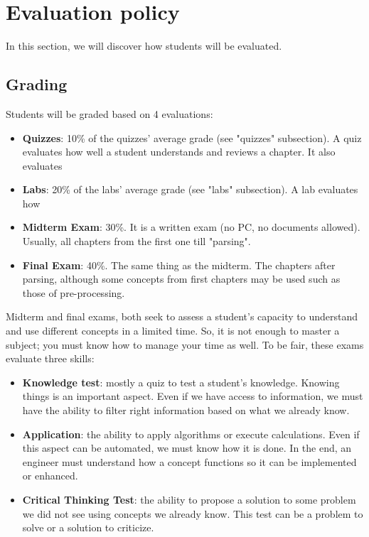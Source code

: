 \documentclass[11pt, a4paper]{article}
\begin{document}
\section{Evaluation policy}

In this section, we will discover how students will be evaluated.

\subsection{Grading}

Students will be graded based on 4 evaluations:
\begin{itemize}
	\item \textbf{Quizzes}: 10\% of the quizzes' average grade (see "quizzes" subsection). 
	A quiz evaluates how well a student understands and reviews a chapter. 
	It also evaluates 
	\item \textbf{Labs}: 20\% of the labs' average grade (see "labs" subsection).
	A lab evaluates how 
	\item \textbf{Midterm Exam}: 30\%. It is a written exam (no PC, no documents allowed). 
	Usually, all chapters from the first one till "parsing".
	\item \textbf{Final Exam}: 40\%. The same thing as the midterm. The chapters after parsing, although some concepts from first chapters may be used such as those of pre-processing.
\end{itemize}

Midterm and final exams, both seek to assess a student's capacity to understand and use different concepts in a limited time. 
So, it is not enough to master a subject; you must know how to manage your time as well.
To be fair, these exams evaluate three skills:
\begin{itemize}
	\item \textbf{Knowledge test}: mostly a quiz to test a student's knowledge. 
	Knowing things is an important aspect.
	Even if we have access to information, we must have the ability to filter right information based on what we already know.
	\item \textbf{Application}: the ability to apply algorithms or execute calculations.
	Even if this aspect can be automated, we must know how it is done.
	In the end, an engineer must understand how a concept functions so it can be implemented or enhanced.
	\item \textbf{Critical Thinking Test}: the ability to propose a solution to some problem we did not see using concepts we already know.
	This test can be a problem to solve or a solution to criticize.
\end{itemize}
\end{document}

